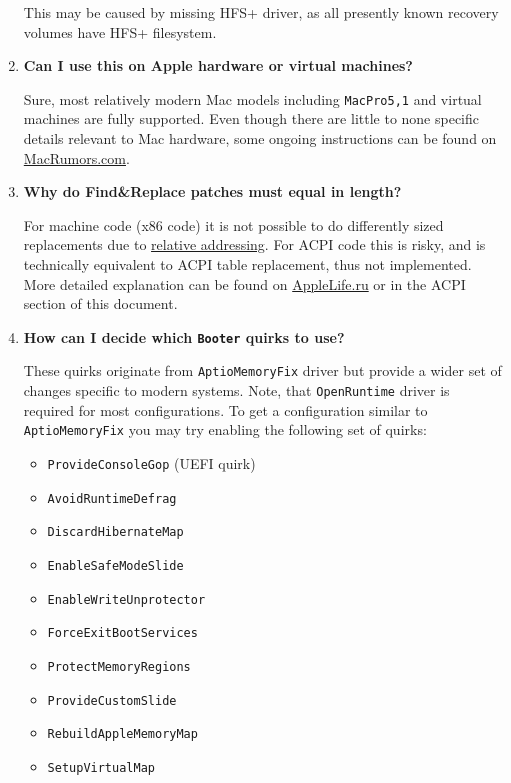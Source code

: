 \documentclass[]{article}
\providecommand{\tightlist}{%
  \setlength{\itemsep}{0pt}\setlength{\parskip}{0pt}}
\begin{document}
\begin{enumerate}
  This may be caused by missing HFS+ driver, as all presently known recovery volumes
  have HFS+ filesystem.

\item
  \textbf{Can I use this on Apple hardware or virtual machines?}

  Sure, most relatively modern Mac models including \texttt{MacPro5,1} and virtual machines
  are fully supported. Even though there are little to none specific details relevant to
  Mac hardware, some ongoing instructions can be found on
  \href{https://forums.macrumors.com/threads/opencore-on-the-mac-pro.2207814}{MacRumors.com}.

\item
  \textbf{Why do Find\&Replace patches must equal in length?}

  For machine code (x86 code) it is not possible to do differently sized replacements due to
  \href{https://en.wikipedia.org/w/index.php?title=Relative_addressing}{relative addressing}.
  For ACPI code this is risky, and is technically equivalent to ACPI table replacement,
  thus not implemented. More detailed explanation can be found on
  \href{https://applelife.ru/posts/819790}{AppleLife.ru} or in the ACPI section of this document.

\item
  \textbf{How can I decide which \texttt{Booter} quirks to use?}

  These quirks originate from \texttt{AptioMemoryFix} driver but provide a wider
  set of changes specific to modern systems. Note, that \texttt{OpenRuntime}
  driver is required for most configurations. To get a configuration similar
  to \texttt{AptioMemoryFix} you may try enabling the following set of quirks:
  \begin{itemize}
  \tightlist
  \item \texttt{ProvideConsoleGop} (UEFI quirk)
  \item \texttt{AvoidRuntimeDefrag}
  \item \texttt{DiscardHibernateMap}
  \item \texttt{EnableSafeModeSlide}
  \item \texttt{EnableWriteUnprotector}
  \item \texttt{ForceExitBootServices}
  \item \texttt{ProtectMemoryRegions}
  \item \texttt{ProvideCustomSlide}
  \item \texttt{RebuildAppleMemoryMap}
  \item \texttt{SetupVirtualMap}
  \end{itemize}


\end{enumerate}
\end{document}
